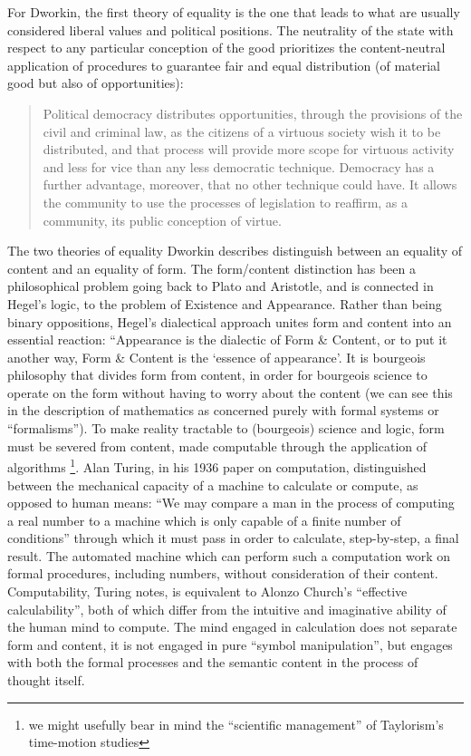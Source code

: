 \documentclass[12pt,oneside]{memoir}
\begin{document}
For Dworkin, the first theory of equality is the one that leads to what are usually considered liberal values and political positions. The neutrality of the state with respect to any particular conception of the good prioritizes the content-neutral application of procedures to guarantee fair and equal distribution (of material good but also of opportunities):
	
\begin{quote}
Political democracy distributes opportunities, through the provisions of the civil and criminal law, as the citizens of a virtuous society wish it to be distributed, and that process will provide more scope for virtuous activity and less for vice than any less democratic technique. Democracy has a further advantage, moreover, that no other technique could have. It allows the community to use the processes of legislation to reaffirm, as a community, its public conception of virtue. \cite[137]{Dworkin1978}
\end{quote}

The two theories of equality Dworkin describes distinguish between an equality of content and an equality of form. The form/content distinction has been a philosophical problem going back to Plato and Aristotle, and is connected in Hegel's logic, to the problem of Existence and Appearance. Rather than being binary oppositions, Hegel's dialectical approach unites form and content into an essential reaction: ``Appearance is the dialectic of Form \& Content, or to put it another way, Form \& Content is the `essence of appearance'. It is bourgeois philosophy that divides form from content, in order for bourgeois science to operate on the form without having to worry about the content (we can see this in the description of mathematics as concerned purely with formal systems or ``formalisms''). To make reality tractable to (bourgeois) science and logic, form must be severed from content, made computable through the application of algorithms \footnote{we might usefully bear in mind the ``scientific management'' of Taylorism's time-motion studies}. Alan Turing, in his 1936 paper on computation, distinguished between the mechanical capacity of a machine to calculate or compute, as opposed to  human means: ``We may compare a man in the process of computing a real number to a machine which is only capable of a finite number of conditions'' \citep[231]{Turing1936} through which it must pass in order to calculate, step-by-step, a final result. The automated machine which can perform such a computation work on formal procedures, including numbers, without consideration of their content. Computability, Turing notes, is equivalent to Alonzo Church's ``effective calculability'', both of which differ from the intuitive and imaginative ability of the human mind to compute. The mind engaged in calculation does not separate form and content, it is not engaged in pure ``symbol manipulation'', but engages with both the formal processes and the semantic content in the process of thought itself.
	 	
\end{document}
